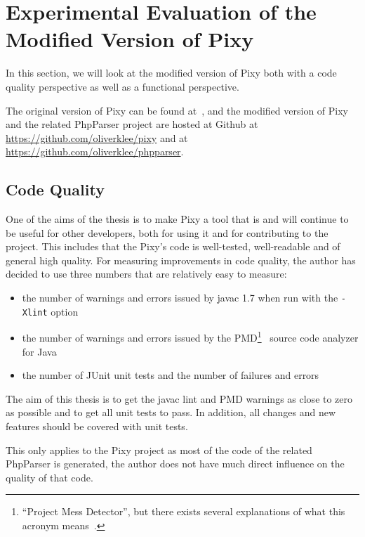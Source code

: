 \chapter{Experimental Evaluation of the Modified Version of Pixy}

In this section, we will look at the modified version of Pixy both with a code quality perspective as well as a functional perspective.

The original version of Pixy can be found at~\cite{pixy}, and the modified version of Pixy and the related PhpParser project are hosted at Github at \url{https://github.com/oliverklee/pixy} and at \url{https://github.com/oliverklee/phpparser}.

\section{Code Quality}
\label{code-quality}
One of the aims of the thesis is to make Pixy a tool that is and will continue to be useful for other developers, both for using it and for contributing to the project. This includes that the Pixy's code is well-tested, well-readable and of general high quality. For measuring improvements in code quality, the author has decided to use three numbers that are relatively easy to measure:

\begin{itemize}
  \item the number of warnings and errors issued by javac 1.7 when run with the \texttt{-Xlint} option
  \item the number of warnings and errors issued by the PMD\footnote{``Project Mess Detector'', but there exists several explanations of what this acronym means~\cite{pmd-meaning}.}~\cite{pmd} source code analyzer for Java
  \item the number of JUnit unit tests and the number of failures and errors
\end{itemize}

The aim of this thesis is to get the javac lint and PMD warnings as close to zero as possible and to get all unit tests to pass. In addition, all changes and new features should be covered with unit tests.

This only applies to the Pixy project as most of the code of the related PhpParser is generated, \ie the author does not have much direct influence on the quality of that code.

